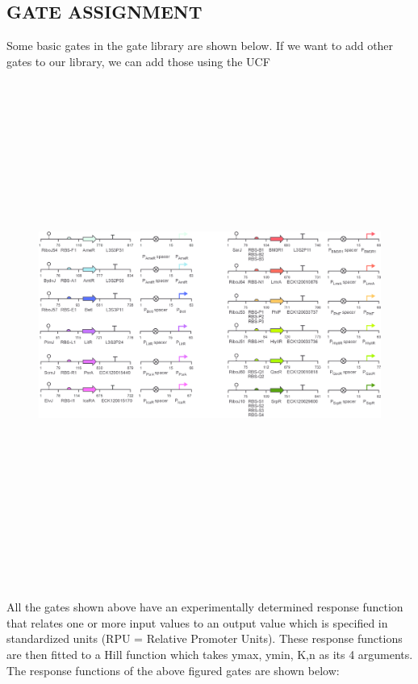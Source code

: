 \documentclass[11pt]{article}
\begin{document}
\subsection*{GATE ASSIGNMENT}
Some basic gates in the gate library are shown below. If we want to add other gates to our library, we can add those using the UCF
\begin{figure}[ht!]
\centering
\includegraphics[width=16cm,height=16cm,keepaspectratio]{gate_parts_library.png}
\label{Case exmaple}
\end{figure}
\\[\baselineskip]    
All the gates shown above have an experimentally determined response function that relates one or more input values to an output value which is specified in standardized units (RPU = Relative Promoter Units). These response functions are then fitted to a Hill function which takes ymax, ymin, K,n as its 4 arguments.
The response functions of the above figured gates are shown below: 
\end{document}
